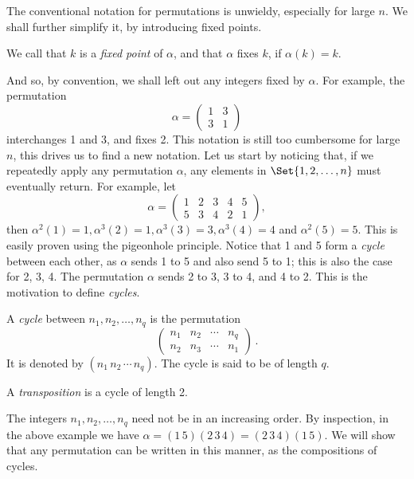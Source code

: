 \documentclass[main.tex]{subfiles}
\begin{document}
				The conventional notation for permutations is unwieldy, especially for large $n$. We shall further simplify it, by introducing fixed points.
				\begin{definition}
					We call that $k$ is a \textit{fixed point}  of $\alpha$, and that $\alpha$ fixes $k$, if $\alpha(k) = k$.
				\end{definition}
				And so, by convention, we shall left out any integers fixed by $\alpha$. For example, the permutation
				\begin{equation*}
				\alpha = \begin{pmatrix}
				1 & 3 \\
				3 & 1
				\end{pmatrix}
				\end{equation*}
				interchanges 1 and 3, and fixes 2. This notation is still too cumbersome for large $n$, this drives us to find a new notation. Let us start by noticing that, if we repeatedly apply any permutation $\alpha$, any elements in $\Set{1, 2, \ldots, n}$ must eventually return. For example, let
				\begin{equation*}
				\alpha = \begin{pmatrix}
				1 & 2 & 3 & 4 & 5\\
				5 & 3 & 4 & 2 & 1
				\end{pmatrix},
				\end{equation*}
				then $\alpha^2(1) = 1, \alpha^3(2) = 1, \alpha^3(3) = 3, \alpha^3(4) = 4$ and $\alpha^2(5) = 5$. This is easily proven using the pigeonhole principle. Notice that 1 and 5 form a \textit{cycle} between each other, as $\alpha$ sends 1 to 5 and also send 5 to 1; this is also the case for 2, 3, 4. The permutation $\alpha$ sends 2 to 3, 3 to 4, and 4 to 2. This is the motivation to define \textit{cycles}.
				\begin{definition}
					A \textit{cycle} between $n_1, n_2, \ldots, n_q$ is the permutation
					\begin{equation*}
					\begin{pmatrix}
					n_1 & n_2 & \cdots & n_q \\
					n_2 & n_3 & \cdots & n_1
					\end{pmatrix}\,.
					\end{equation*}
					It is denoted by $(n_1\,n_2\,\cdots\,n_q)$. The cycle is said to be of length $q$.
				\end{definition}
				\begin{definition}
					A \textit{transposition} is a cycle of length 2.
				\end{definition}
				The integers $n_1, n_2, \ldots, n_q$ need not be in an increasing order. By inspection, in the above example we have $\alpha = (1\,5)(2\, 3\,4) = (2\,3\,4)(1\,5)$. We will show that any permutation can be written in this manner, as the compositions of cycles.
				
\end{document}
